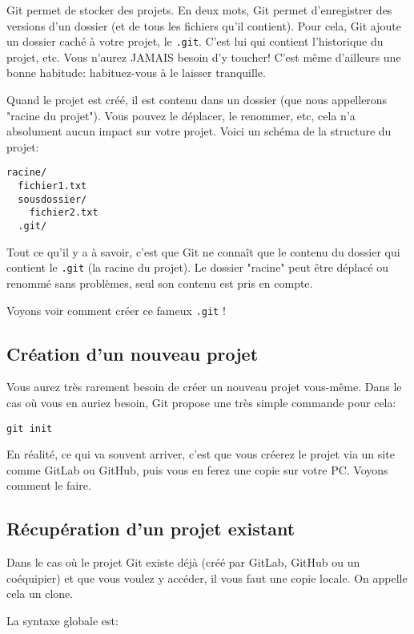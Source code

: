 \documentclass[10pt,a4paper]{article}
\begin{document}
Git permet de stocker des projets. En deux mots, Git permet d'enregistrer des versions d'un dossier (et de tous les fichiers qu'il contient). Pour cela, Git ajoute un dossier caché à votre projet, le {\tt .git}. C'est lui qui contient l'historique du projet, etc. Vous n'aurez JAMAIS besoin d'y toucher! C'est même d'ailleurs une bonne habitude: habituez-vous à le laisser tranquille.

Quand le projet est créé, il est contenu dans un dossier (que nous appellerons "racine du projet"). Vous pouvez le déplacer, le renommer, etc, cela n'a absolument aucun impact sur votre projet. Voici un schéma de la structure du projet:

\begin{verbatim}
racine/
  fichier1.txt
  sousdossier/
    fichier2.txt
  .git/
\end{verbatim}

Tout ce qu'il y a à savoir, c'est que Git ne connaît que le contenu du dossier qui contient le {\tt .git} (la racine du projet). Le dossier "racine" peut être déplacé ou renommé sans problèmes, seul son contenu est pris en compte.

Voyons voir comment créer ce fameux {\tt .git} !

\subsection{Création d'un nouveau projet}

Vous aurez très rarement besoin de créer un nouveau projet vous-même. Dans le cas où vous en auriez besoin, Git propose une très simple commande pour cela:

\begin{verbatim}
git init
\end{verbatim}

En réalité, ce qui va souvent arriver, c'est que vous créerez le projet via un site comme GitLab ou GitHub, puis vous en ferez une copie sur votre PC. Voyons comment le faire.

\subsection{Récupération d'un projet existant}

Dans le cas où le projet Git existe déjà (créé par GitLab, GitHub ou un coéquipier) et que vous voulez y accéder, il vous faut une copie locale. On appelle cela un clone.

La syntaxe globale est:
\end{document}
